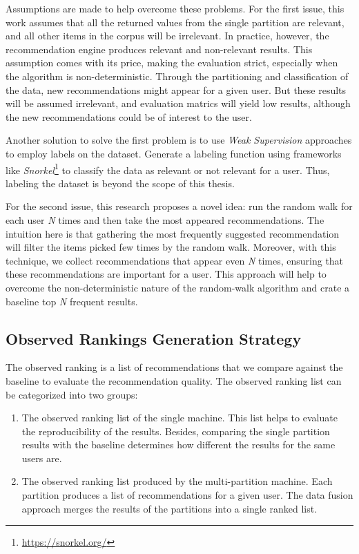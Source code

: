Assumptions are made to help overcome these problems. For the first issue, this work assumes that all the returned values from the single partition are relevant, and all other items in the corpus will be irrelevant. In practice, however, the recommendation engine produces relevant and non-relevant results. This assumption comes with its price, making the evaluation strict, especially when the algorithm is non-deterministic. Through the partitioning and classification of the data, new recommendations might appear for a given user. But these results will be assumed irrelevant, and evaluation matrics will yield low results, although the new recommendations could be of interest to the user.


Another solution to solve the first problem is to use \emph{Weak Supervision} approaches to employ labels on the dataset. Generate a labeling function using frameworks like \emph{Snorkel}\footnote{\url{https://snorkel.org/}} to classify the data as relevant or not relevant for a user. Thus, labeling the dataset is beyond the scope of this thesis.


For the second issue, this research proposes a novel idea: run the random walk for each user \emph{N} times and then take the most appeared recommendations. The intuition here is that gathering the most frequently suggested recommendation will filter the items picked few times by the random walk. Moreover, with this technique, we collect recommendations that appear even \emph{N} times, ensuring that these recommendations are important for a user. This approach will help to overcome the non-deterministic nature of the random-walk algorithm and crate a baseline top \emph{N} frequent results.


\subsection{Observed Rankings Generation Strategy}
\label{subsec:comparing-recommendtions}
The observed ranking is a list of recommendations that we compare against the baseline to evaluate the recommendation quality. The observed ranking list can be categorized into two groups:

\begin{enumerate}
    \item The observed ranking list of the single machine. This list helps to evaluate the reproducibility of the results. Besides, comparing the single partition results with the baseline determines how different the results for the same users are. 
    
    \item The observed ranking list produced by the multi-partition machine. Each partition produces a list of recommendations for a given user. The data fusion approach merges the results of the partitions into a single ranked list. 
\end{enumerate}
